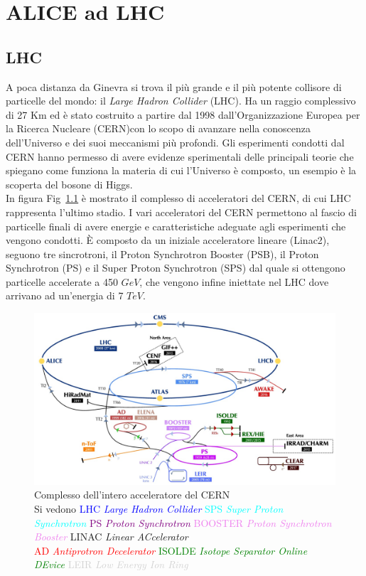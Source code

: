 \chapter{ALICE ad LHC}

\section{LHC}
A poca distanza da Ginevra si trova il più grande e il più potente collisore di particelle del mondo: il \textit{Large Hadron Collider} (LHC). Ha un raggio complessivo di 27 Km ed è stato costruito a partire dal 1998 dall'Organizzazione Europea per la Ricerca Nucleare (CERN)con lo scopo di avanzare nella conoscenza dell'Universo e dei suoi meccanismi più profondi. Gli esperimenti condotti dal CERN hanno permesso di avere evidenze sperimentali delle principali teorie che spiegano come funziona la materia di cui l'Universo è composto, un esempio è la scoperta del bosone di Higgs. 
\\In figura Fig~\ref{fig:CERNcomplex} è mostrato il complesso di acceleratori del CERN, di cui LHC rappresenta l'ultimo stadio. I vari acceleratori del CERN permettono al fascio di particelle finali di avere energie e caratteristiche adeguate agli esperimenti che vengono condotti. È composto da un iniziale acceleratore lineare (Linac2), seguono tre sincrotroni, il Proton Synchrotron Booster (PSB), il Proton Synchrotron (PS) e il Super Proton Synchrotron (SPS) dal quale si ottengono particelle accelerate a 450 $GeV$, che vengono infine iniettate nel LHC dove arrivano ad un'energia di 7 $TeV$. \cite{tesi_barbano}
 
    \begin{figure}[htbp]
        \centering
        \includegraphics[width=0.8\linewidth]{ALICE/CernComplex_2018.png}   
        \caption{Complesso dell'intero acceleratore del CERN \\\small{Si vedono  \textcolor{blue}{LHC \textit{Large Hadron Collider}} \textcolor{cyan}{SPS \textit{Super Proton Synchrotron}} \textcolor{purple}{ PS \textit{Proton Synchrotron}} \textcolor{violet}{BOOSTER \textit{ Proton Synchrotron Booster}} LINAC \textit{Linear ACcelerator}} \\{\footnotesize  \textcolor{red}{AD \textit{Antiprotron Decelerator}} \textcolor{green}{ISOLDE \textit{Isotope Separator Online DEvice}}  \textcolor{lightgray}{LEIR \textit{Low Energy Ion Ring}} }}
        \label{fig:CERNcomplex}
    \end{figure}
    
